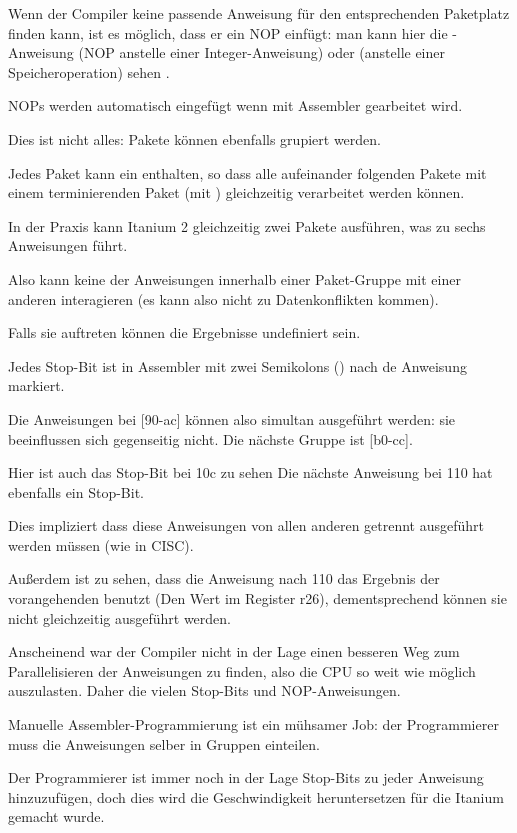 Wenn der Compiler keine passende Anweisung für den entsprechenden Paketplatz finden
kann, ist es möglich, dass er ein \ac{NOP} einfügt: man kann hier die -Anweisung
(\ac{NOP} anstelle einer Integer-Anweisung) oder  (anstelle einer Speicheroperation)
sehen .

\ac{NOP}s werden automatisch eingefügt wenn mit Assembler gearbeitet wird.

Dies ist nicht alles: Pakete können ebenfalls grupiert werden.

Jedes Paket kann ein   enthalten, so dass alle aufeinander folgenden
Pakete mit einem terminierenden Paket (mit ) gleichzeitig verarbeitet
werden können.

In der Praxis kann Itanium 2 gleichzeitig zwei Pakete ausführen, was zu sechs
Anweisungen führt.

Also kann keine der Anweisungen innerhalb einer Paket-Gruppe mit einer anderen
interagieren (es kann also nicht zu Datenkonflikten kommen).

Falls sie auftreten können die Ergebnisse undefiniert sein.

Jedes Stop-Bit ist in Assembler mit zwei Semikolons (\TT{;;}) nach de Anweisung markiert.

Die Anweisungen bei [90-ac] können also simultan ausgeführt werden: sie beeinflussen
sich gegenseitig nicht. Die nächste Gruppe ist [b0-cc].

Hier ist auch das Stop-Bit bei 10c zu sehen
Die nächste Anweisung bei 110 hat ebenfalls ein Stop-Bit.

Dies impliziert dass diese Anweisungen von allen anderen getrennt ausgeführt werden
müssen (wie in \ac{CISC}).

Außerdem ist zu sehen, dass die Anweisung nach 110 das Ergebnis der vorangehenden
benutzt (Den Wert im Register r26), dementsprechend können sie nicht gleichzeitig
ausgeführt werden.

Anscheinend war der Compiler nicht in der Lage einen besseren Weg zum Parallelisieren
der Anweisungen zu finden, also die \ac{CPU} so weit wie möglich auszulasten. Daher
die vielen Stop-Bits und \ac{NOP}-Anweisungen.

Manuelle Assembler-Programmierung ist ein mühsamer Job: der Programmierer muss
die Anweisungen selber in Gruppen einteilen.

Der Programmierer ist immer noch in der Lage Stop-Bits zu jeder Anweisung hinzuzufügen,
doch dies wird die Geschwindigkeit heruntersetzen für die Itanium gemacht wurde.

